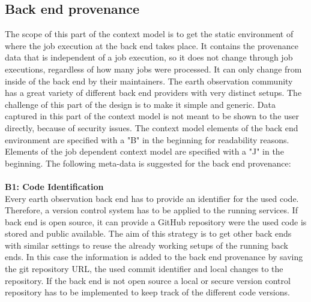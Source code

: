 \documentclass[draft,final]{vutinfth} %
\begin{document}
\subsection{Back end provenance}\label{Design:Back end provenance}
The scope of this part of the context model is to get the static environment of where the job execution at the back end takes place. It contains the provenance data that is independent of a job execution, so it does not change through job executions, regardless of how many jobs were processed. It can only change from inside of the back end by their maintainers. The earth observation community has a great variety of different back end providers with very distinct setups. The challenge of this part of the design is to make it simple and generic. Data captured in this part of the context model is not meant to be shown to the user directly, because of security issues.  The context model elements of the back end environment are specified with a "B" in the beginning for readability reasons. Elements of the job dependent context model are specified with a "J" in the beginning. The following meta-data is suggested for the back end provenance:
\\ \\
\textbf{B1: Code Identification} \\
Every earth observation back end has to provide an identifier for the used code. Therefore, a version control system has to be applied to the running services. If back end is open source, it can provide a GitHub repository were the used code is stored and public available. The aim of this strategy is to get other back ends with similar settings to reuse the already working setups of the running back ends. In this case the information is added to the back end provenance by saving the git repository URL, the used commit identifier and local changes to the repository. If the back end is not open source a local or secure version control repository has to be implemented to keep track of the different code versions. 
\end{document}
